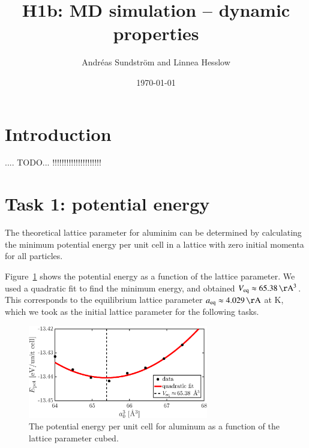 
\usepackage{units}
\usepackage{physics}

\newcommand{\ee}{\mathrm{e}}
\newcommand{\ii}{\mathrm{i}}

\title{H1b: MD simulation -- dynamic properties}
\author{Andr\'eas Sundstr\"om and Linnea Hesslow}
\date{\today}





\section*{Introduction}

.... TODO... !!!!!!!!!!!!!!!!!!!!!

\section*{Task 1: potential energy}
The theoretical lattice parameter for aluminim can be determined by calculating the minimum potential energy per unit cell in a lattice with zero initial momenta for all particles. 

Figure~\ref{fig1} shows the potential energy as a function of the lattice parameter. We used a quadratic fit to find the minimum energy, and obtained $V_{\rm eq} \approx \unit[65.38]{\AA^3}$. This corresponds to the equilibrium lattice parameter $a_{\rm eq} \approx \unit[4.029]{\AA}$ at \unit[0]{K}, which we took as the initial lattice parameter for the following tasks.  

\begin{figure}[!ht]
\begin{center}
  \includegraphics[width=0.7\textwidth]{../figures/potential_energy} 
  \caption{The potential energy per unit cell for aluminum as a function of the lattice parameter cubed.}
  \label{fig1}
\end{center}
\end{figure}

